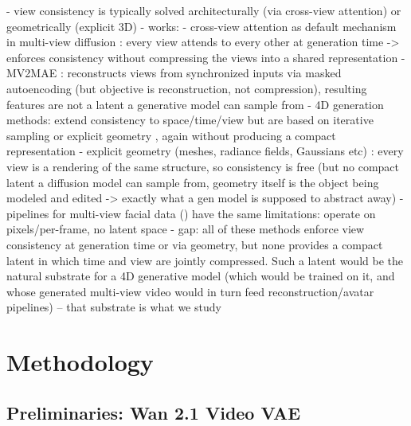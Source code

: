 - view consistency is typically solved architecturally (via cross-view attention) or geometrically (explicit 3D)
- works:
    - cross-view attention as default mechanism in multi-view diffusion \cite{shi2023mvdream, gao2024cat3d, voleti2024sv3d, zuo2024videomv}: every view attends to every other at generation time -> enforces consistency without compressing the views into a shared representation
    - MV2MAE \cite{shah2024mv2mae}: reconstructs views from synchronized inputs via masked autoencoding (but objective is reconstruction, not compression), resulting features are not a latent a generative model can sample from
    - 4D generation methods: extend consistency to space/time/view but are based on iterative sampling or explicit geometry \cite{zhang20244diffusion, xie2024sv4d, shao2024human4dit, jiang2026mesh4d}, again without producing a compact representation
    - explicit geometry (meshes, radiance fields, Gaussians etc) \cite{qian2024gaussianavatars, kirschstein2023nersemble}: every view is a rendering of the same structure, so consistency is free (but no compact latent a diffusion model can sample from, geometry itself is the object being modeled and edited -> exactly what a gen model is supposed to abstract away)
    - pipelines for multi-view facial data (\cite{lombardi2018deep, lombardi2021mixture}) have the same limitations: operate on pixels/per-frame, no latent space
- gap: all of these methods enforce view consistency at generation time or via geometry, but none provides a compact latent in which time and view are jointly compressed. Such a latent would be the natural substrate for a 4D generative model (which would be trained on it, and whose generated multi-view video would in turn feed reconstruction/avatar pipelines) -- that substrate is what we study

\section{Methodology}

\subsection{Preliminaries: Wan 2.1 Video VAE}
\label{sec:preliminaries}

